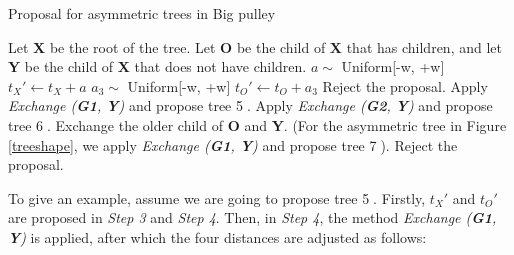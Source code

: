 \documentclass{bmcart}
\begin{document}
\begin{algorithm}
\caption{Proposal for asymmetric trees in Big pulley}
\label{asymmetric tree proposal}
\begin{algorithmic}
\STATE {}
\STATE Let \textbf{X} be the root of the tree.
\STATE Let \textbf{O} be the child of \textbf{X} that has children, and let \textbf{Y} be the child of \textbf{X} that does not have children. 
\STATE {}
\STATE $a \sim$ Uniform[-w, +w]
\STATE ${t_X}' \leftarrow {t_X} + a$
\STATE {}
\STATE ${a_3} \sim$ Uniform[-w, +w]
\STATE ${t_O}' \leftarrow {t_O} + {a_3}$
\STATE Reject the proposal.
\ENDIF
\STATE {}
\STATE Apply \textit{Exchange (\textbf{G1}, \textbf{Y})} and propose tree \textcircled5.
\ELSE
\STATE Apply \textit{Exchange (\textbf{G2}, \textbf{Y})} and propose tree \textcircled6.
\ENDIF
{}
\STATE Exchange the older child of \textbf{O} and \textbf{Y}.  (For the asymmetric tree in Figure \ref{treeshape}, we apply \textit{Exchange (\textbf{G1}, \textbf{Y})} and propose tree \textcircled7).
\STATE Reject the proposal.
\ENDIF
\STATE {}
\STATE {}
\end{algorithmic}
\end{algorithm}

To give an example, assume we are going to propose tree \textcircled5. Firstly, ${t_X}'$ and ${t_O}'$ are proposed in \emph{Step 3} and \emph{Step 4}. Then, in \emph{Step 4}, the method \textit{Exchange (\textbf{G1}, \textbf{Y})} is applied, after which the four distances are adjusted as follows:
\end{document}
